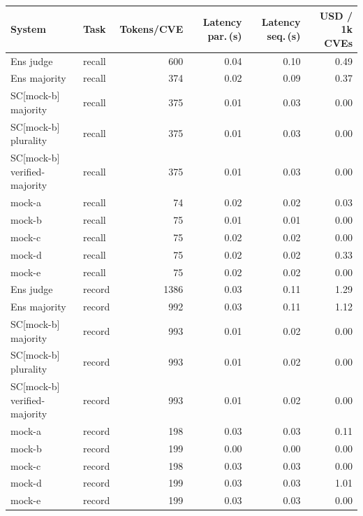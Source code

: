 \begin{tabular}{llrrrr}
\toprule
System & Task & Tokens/CVE & Latency par.\,(s) & Latency seq.\,(s) & USD / 1k CVEs \\
\midrule
Ens judge & recall & 600 & 0.04 & 0.10 & 0.49 \\
Ens majority & recall & 374 & 0.02 & 0.09 & 0.37 \\
\midrule
SC[mock-b] majority & recall & 375 & 0.01 & 0.03 & 0.00 \\
SC[mock-b] plurality & recall & 375 & 0.01 & 0.03 & 0.00 \\
SC[mock-b] verified-majority & recall & 375 & 0.01 & 0.03 & 0.00 \\
\midrule
mock-a & recall & 74 & 0.02 & 0.02 & 0.03 \\
mock-b & recall & 75 & 0.01 & 0.01 & 0.00 \\
mock-c & recall & 75 & 0.02 & 0.02 & 0.00 \\
mock-d & recall & 75 & 0.02 & 0.02 & 0.33 \\
mock-e & recall & 75 & 0.02 & 0.02 & 0.00 \\
\midrule
Ens judge & record & 1386 & 0.03 & 0.11 & 1.29 \\
Ens majority & record & 992 & 0.03 & 0.11 & 1.12 \\
\midrule
SC[mock-b] majority & record & 993 & 0.01 & 0.02 & 0.00 \\
SC[mock-b] plurality & record & 993 & 0.01 & 0.02 & 0.00 \\
SC[mock-b] verified-majority & record & 993 & 0.01 & 0.02 & 0.00 \\
\midrule
mock-a & record & 198 & 0.03 & 0.03 & 0.11 \\
mock-b & record & 199 & 0.00 & 0.00 & 0.00 \\
mock-c & record & 198 & 0.03 & 0.03 & 0.00 \\
mock-d & record & 199 & 0.03 & 0.03 & 1.01 \\
mock-e & record & 199 & 0.03 & 0.03 & 0.00 \\
\bottomrule
\end{tabular}
